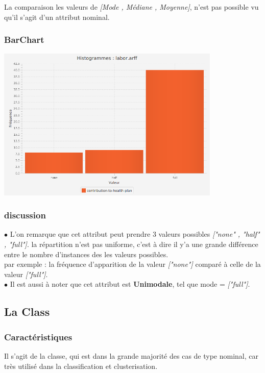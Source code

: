 \documentclass[12pt,a4paper,oneside]{book}
\begin{document}
La comparaison les valeurs de \textit{[Mode , Médiane , Moyenne]}, n'est pas possible vu qu'il s'agit d'un attribut nominal.

\subsubsection{BarChart}

\begin{center}
	\includegraphics[width=0.8\textwidth]{screens/barchart/contribution-to-health-plan-barchart.png}%
	\label{labelname}%
\end{center}

\subsubsection{discussion}
$\bullet $ L'on remarque que cet attribut peut prendre 3 valeurs possibles \textit{["none" , "half" , "full"]}. la répartition n'est pas uniforme, c'est à dire il y'a une grande différence entre le nombre d'instances des les valeurs possibles.\\
par exemple : la fréquence d'apparition de la valeur \textit{["none"]} comparé à celle de la valeur \textit{["full"]}.\\
$\bullet $ Il est aussi à noter que cet attribut est \textbf{Unimodale}, tel que mode = \textit{["full"]}.

\newpage

\subsection{La Class }
\subsubsection{Caractéristiques}
Il s'agit de la classe, qui est dans la grande majorité des cas de type nominal, car très utilisé dans la classification et clusterisation.
\end{document}
